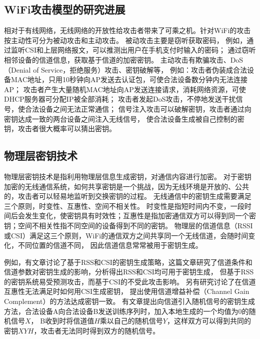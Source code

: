 		\subsection{WiFi攻击模型的研究进展}\label{subsec:attack_model}
		相对于有线网络，无线网络的开放性给攻击者带来了可乘之机。针对WiFi的攻击按主动性可分为被动攻击和主动攻击。
		被动攻击主要是窃听获取密码，
		例如，通过监听CSI和上层网络报文，可以推测出用户在手机支付时输入的密码\cite{ccs16csi}；
		通过窃听相邻设备的信道信息，获取基于信道的加密密钥\cite{ccs07robustkey}。
		主动攻击有欺骗攻击、DoS（Denial of Service，拒绝服务）攻击、密钥破解等，
		例如：攻击者伪装成合法设备MAC地址，只用10秒钟向AP发送去认证包，可使合法设备数分钟内无法连接AP\cite{usenix03dos}；
		攻击者产生大量随机MAC地址向AP发送连接请求，消耗网络资源，可使DHCP服务器可分配IP被全部消耗\cite{wisec06spoofing}；
		攻击者发起DoS攻击，不停地发送干扰信号，使合法设备之间无法正常通信\cite{milcom13jamming, jsac12antijamming}；
		信号注入攻击可以破解密钥，攻击者通过向密钥达成一致的两台设备之间注入无线信号，
		使合法设备生成被自己控制的密钥，攻击者很大概率可以猜出密钥\cite{cns15key}。

		\subsection{物理层密钥技术}\label{subsec:phy_tech_key_generation}
		物理层密钥技术是指利用物理层信息生成密钥，对通信内容进行加密。
		对于密钥加密的无线通信系统，如何共享密钥是一个挑战，因为无线环境是开放的、公共的，攻击者可以轻易地监听到交换密钥的过程。
		无线通信中的密钥生成需要满足三个原则，时变性、互惠性、空间不相关性\cite{access16key}。
		时变性是指短时间内不变，一段时间后会发生变化，使密钥具有时效性；互惠性是指加密通信双方可以得到同一个密钥；空间不相关性指不同空间的设备得到不同的密钥。
		物理层的信道信息（RSSI或CSI）满足这三个原则，WiFi的通信双方之间共享同一个无线信道，会随时间变化，不同位置的信道不同，
		因此信道信息常常被用于密钥生成。

		例如，有文章讨论了基于RSS和CSI的密钥生成策略\cite{access16key}，这篇文章研究了信道条件和信道参数对密钥生成的影响，分析得出RSS和CSI均可用于密钥生成，
		但基于RSS的密钥系统易受预测攻击，而基于CSI的不受此攻击影响。
		另有研究讨论了在信道互惠性无法满足时如何用CSI生成密钥\cite{infocom13key}，
		提出使用信道增益补偿（Channel Gain Complement）的方法达成密钥一致。
		有文章提出向信道引入随机信号的密钥生成方法\cite{cns15key}，合法设备A向合法设备B发送训练序列时，加入本地生成的一个均值为0的随机信号$X$，
		B收到时将信道值$H$乘以自己的随机信号$Y$，这样双方可以得到共同的密钥$XYH$，攻击者无法同时得到双方的随机信号。

